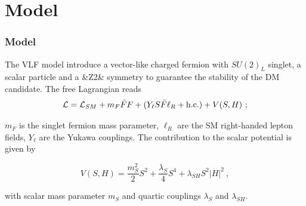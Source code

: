 \documentclass{beamer}
\begin{document}
\begin{frame}
\begin{figure}[!h]
\end{figure}



\end{frame}


\section{Model}
\begin{frame}
\frametitle{Model}
\begin{justify}

The VLF model introduce a vector-like charged fermion with $SU(2)_L$ singlet, a scalar particle and a &Z2& symmetry to guarantee the stability of the DM candidate. The free Lagrangian reads
\begin{equation}\nonumber
\mathcal{L} = \mathcal{L}_{SM} +  m_F \bar{F}F + ( Y_\ell S \bar{F}\ell_R + {\rm h.c.} ) + V(S,H)~;
\end{equation}\label{EQ}

$m_F$ is the singlet fermion mass parameter, $\ell_R$ are the SM right-handed lepton fields, $Y_\ell$ 
are the Yukawa couplings. The contribution to the scalar potential is given by

\begin{equation}\nonumber
V(S,H) = \frac{m_S^2}{2} S^2 + \frac{\lambda_S}{4} S^4 + \lambda_{SH} S^2|H|^2 ~,
\end{equation}

with scalar mass parameter $m_S$ and quartic couplings $\lambda_{S}$ and $\lambda_{SH}$.


\end{justify}

\end{frame}
\end{document}
